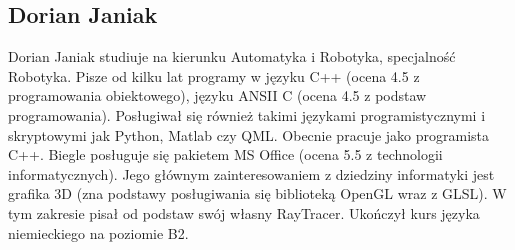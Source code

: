 \subsection{Dorian Janiak}
Dorian Janiak studiuje na kierunku Automatyka i Robotyka, specjalność Robotyka. 
Pisze od kilku lat programy w języku C++ (ocena 4.5 z programowania obiektowego), języku ANSII C (ocena 4.5 z podstaw programowania).
Posługiwał się również  takimi językami programistycznymi i skryptowymi jak Python, Matlab czy QML.
Obecnie pracuje jako programista C++. Biegle posługuje się pakietem MS Office (ocena 5.5 z technologii informatycznych). 
Jego głównym zainteresowaniem z dziedziny informatyki jest grafika 3D (zna podstawy posługiwania się biblioteką OpenGL wraz z GLSL).
W tym zakresie pisał od podstaw swój własny RayTracer.
Ukończył kurs języka niemieckiego na poziomie B2.  

